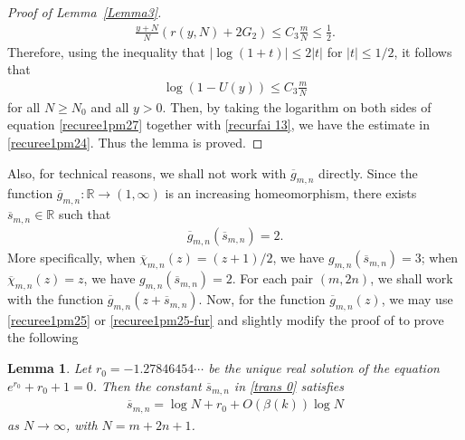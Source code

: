 \documentclass[12pt]{amsart}
\numberwithin{equation}{section}
\newtheorem{lemma}[theorem]{Lemma}
\begin{document}
\begin{proof}[Proof of Lemma~\ref{Lemma3}]
\begin{equation}\label{recurfai   12}
\begin{split}
\frac{y+N}{N}(r(y,N)+2G_2) \leq C_3\frac{m}{N}\leq \frac{1}{2}.
\end{split}
\end{equation}
Therefore, using the inequality that $|\log (1+t)|\leq 2|t|$ for $|t|\leq 1/2$, it follows that
\begin{equation}\label{recurfai   13}
\begin{split}
\log(1-U(y))\leq C_3\frac{m}{N}
\end{split}
\end{equation}
for all $N\geq N_0$ and all $y>0$. Then, by taking the logarithm on both sides of equation \eqref{recuree1pm27} together with \eqref{recurfai   13}, we have the estimate in \eqref{recuree1pm24}. Thus the lemma is proved.

\end{proof}

Also, for technical reasons, we shall not work with $\overline{g}_{m,n}$ directly. Since the function $\overline{g}_{m,n}:\mathbb{R}\to(1,\infty)$ is an increasing homeomorphism, there exists $\overline{s}_{m,n}\in \mathbb{R}$ such that
\begin{equation}\label{trans 0}
\begin{split}
\overline{g}_{m,n}(\overline{s}_{m,n})=2.
\end{split}
\end{equation}
More specifically, when $\overline{\chi}_{m,n}(z)=(z+1)/2$, we have $g_{m,n}(\overline{s}_{m,n})=3$; when $\overline{\chi}_{m,n}(z)=z$, we have $g_{m,n}(\overline{s}_{m,n})=2$. For each pair $(m,2n)$, we shall work with the function $\overline{g}_{m,n}(z+\overline{s}_{m,n})$. Now, for the function $\overline{g}_{m,n}(z)$, we may use \eqref{recuree1pm25} or \eqref{recuree1pm25-fur} and slightly modify the proof of \cite[Lemma~2.4]{Zhang2024} to prove the following


\begin{lemma}\label{Lemma3 trans}
Let $r_0=-1.27846454\cdots$ be the unique real solution of the equation $e^{r_0}+r_0+1=0$. Then the constant $\overline{s}_{m,n}$ in \eqref{trans 0} satisfies
\begin{equation}\label{recuree1pm31=jgg}
\begin{split}
\overline{s}_{m,n}=\log N+r_0+O(\beta(k))\log N
\end{split}
\end{equation}
as $N\to\infty$, with $N=m+2n+1$.
\end{lemma}
\end{document}
